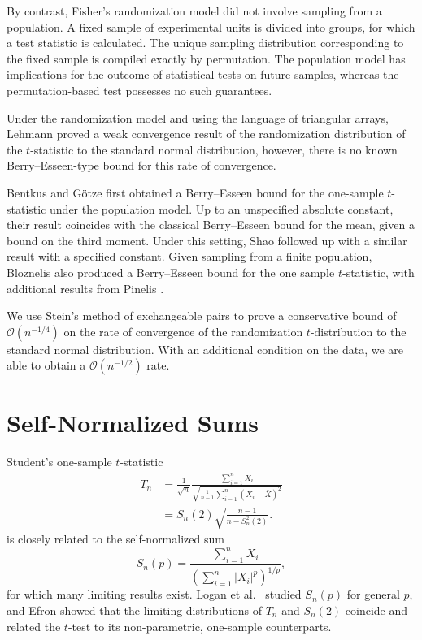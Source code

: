 By contrast, Fisher's randomization model \cite{fisher1935design} did
not involve sampling from a population.  A fixed sample of
experimental units is divided into groups, for which a test statistic
is calculated.  The unique sampling distribution corresponding to the
fixed sample is compiled exactly by permutation.  The population model
has implications for the outcome of statistical tests on future
samples, whereas the permutation-based test possesses no such
guarantees.

Under the randomization model and using the language of triangular
arrays, Lehmann \cite{lehmann1999elements} proved a weak convergence
result of the randomization distribution of the $t$-statistic to the
standard normal distribution, however, there is no known
Berry--Esseen-type bound for this rate of convergence.

Bentkus and G{\"o}tze \cite{bentkus1996berry} first obtained a
Berry--Esseen bound for the one-sample $t$-statistic under the
population model.  Up to an unspecified absolute constant, their result coincides
with the classical Berry--Esseen bound for the mean, given a bound on
the third moment.  Under this setting, Shao \cite{shao2005explicit}
followed up with a similar result with a specified constant.  Given
sampling from a finite population, Bloznelis \cite{bloznelis1999berry}
also produced a Berry--Esseen bound for the one sample $t$-statistic,
with additional results from Pinelis \cite{pinelis2011berry}.

We use Stein's method of exchangeable pairs to prove a conservative
bound of $\mathcal{O}(n^{-1/4})$ on the rate of convergence of the randomization
$t$-distribution to the standard normal distribution.  With an
additional condition on the data, we are able to obtain a
$\mathcal{O}(n^{-1/2})$ rate.

\section{Self-Normalized Sums}
Student's one-sample $t$-statistic
\begin{align*}
  T_n &= \frac{1}{\sqrt{n}} \frac{\sum_{i=1}^n X_i}{\sqrt{\frac{1}{n-1} \sum_{i=1}^n(X_i - \bar{X})^2}} \\
  &= S_n(2) \sqrt{\frac{n-1}{n-S_n^2(2)}}.
\end{align*}
is closely related to the self-normalized sum
\begin{equation*}
  S_n(p) = \frac{\sum_{i=1}^n X_i}{\left ( \sum_{i=1}^n|X_i|^p \right )^{1/p}},
\end{equation*}
for which many limiting results exist.  Logan et al.\
\cite{logan1973limit} studied $S_n(p)$ for general $p$, and
Efron \cite{efron1969student} showed that the limiting distributions of
$T_n$ and $S_n(2)$ coincide and related the $t$-test to its
non-parametric, one-sample counterparts.

